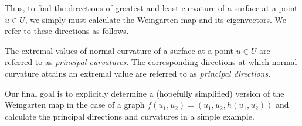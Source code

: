        	Thus, to find the directions of greatest and least curvature of a surface at a point $u \in U$, we simply must calculate the Weingarten map and its eigenvectors. We refer to these directions as follows.
       	
       	\begin{defn}
       		The extremal values of normal curvature of a surface at a point  $u\in U$
       		are referred to as \textit{principal curvatures}. The corresponding directions at which normal curvature attains an extremal value are referred to as \textit{principal directions}.
       	\end{defn}
       	
       	Our final goal is to explicitly determine a (hopefully simplified) version of the Weingarten map in the case of a graph $f(u_1,u_2) = (u_1,u_2, h(u_1,u_2))$ and calculate
       	the principal directions and curvatures in a simple example.
       	        		
